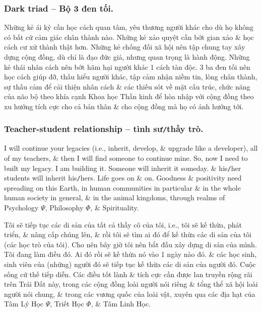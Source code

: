 \documentclass[12pt,oneside]{book}
\begin{document}
\subsubsection*{Dark triad -- Bộ 3 đen tối.} Những kẻ ái kỷ cần học cách quan tâm, yêu thương người khác cho dù họ không có bất cứ cảm giác chân thành nào. Những kẻ xảo quyệt cần bớt gian xảo \& học cách cư xử thành thật hơn. Những kẻ chống đối xã hội nên tập chung tay xây dựng cộng đồng, dù chỉ là đạo đức giả, nhưng quan trọng là hành động. Những kẻ thái nhân cách nên bớt hãm hại người khác 1 cách tàn độc. 3 ba đen tối nên học cách giúp đỡ, thấu hiểu người khác, tập cảm nhận niềm tin, lòng chân thành, sự thấu cảm để cải thiện nhân cách \& các thiếu sót về mặt cấu trúc, chức năng của não bộ theo khía cạnh Khoa học Thần kinh để hòa nhập với cộng đồng theo xu hướng tích cực cho cả bản thân \& cho cộng đồng mà họ có ảnh hưởng tới.

\subsubsection*{Teacher-student relationship -- tình sư{\tt/}thầy trò.} I will continue your legacies (i.e., inherit, develop, \& upgrade like a developer), all of my teachers, \& then I will find someone to continue mine. So, now I need to built my legacy. I am building it. Someone will inherit it someday. \& his{\tt/}her students will inherit his{\tt/}hers. Life goes on \& on. Goodness \& positivity need spreading on this Earth, in human communities in particular \& in the whole human society in general, \& in the animal kingdoms, through realms of Psychology $\Psi$, Philosophy $\Phi$, \& Spirituality.

Tôi sẽ tiếp tục các di sản của tất cả thầy cô của tôi, i.e., tôi sẽ kế thừa, phát triển, \& nâng cấp chúng lên, \& rồi tôi sẽ tìm ai đó để kế thừa các di sản của tôi (các học trò của tôi). Cho nên bây giờ tôi nên bắt đầu xây dựng di sản của mình. Tôi đang làm điều đó. Ai đó rồi sẽ kế thừa nó vào 1 ngày nào đó. \& các học sinh, sinh viên của (những) người đó sẽ tiếp tục kế thừa các di sản của người đó. Cuộc sống cứ thế tiếp diễn. Các điều tốt lành \& tích cực cần được lan truyền rộng rãi trên Trái Đất này, trong các cộng đồng loài người nói riêng \& tổng thể xã hội loài người nói chung, \& trong các vương quốc của loài vật, xuyên qua các địa hạt của Tâm Lý Học $\Psi$, Triết Học $\Phi$, \& Tâm Linh Học.

\end{document}
